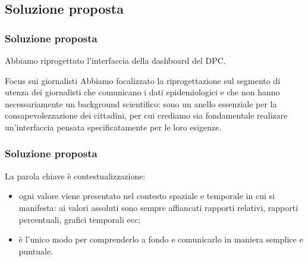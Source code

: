 \documentclass[../../main.tex]{subfiles}
\begin{document}
\subsection{Soluzione proposta}

\begin{frame}
    \frametitle{Soluzione proposta}
    Abbiamo riprogettato l'interfaccia della dashboard del DPC.

    \vspace{-40pt}
    \begin{block}{Focus sui giornalisti}
        Abbiamo focalizzato la riprogettazione sul segmento di utenza dei giornalisti che comunicano i dati epidemiologici e che non hanno necessariamente un background scientifico: sono un anello essenziale per la consapevolezzazione dei cittadini, per cui crediamo sia fondamentale realizare un'interfaccia pensata specificatamente per le loro esigenze.
    \end{block}

\end{frame}

\begin{frame}
    \frametitle{Soluzione proposta}
    
    La parola chiave è \alert{contestualizzazione}:
    \begin{itemize}
        \item ogni valore viene presentato nel contesto spaziale e temporale in cui si manifesta: ai valori assoluti sono sempre affiancati rapporti relativi, rapporti percentuali, grafici temporali ecc;
        \item è l'unico modo per comprenderlo a fondo e comunicarlo in maniera semplice e puntuale.
    \end{itemize}
    

\end{frame}
\end{document}
